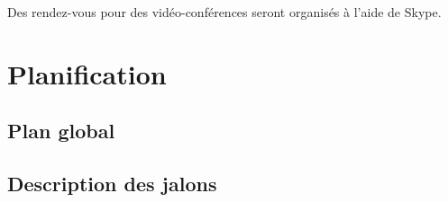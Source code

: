 		Des rendez-vous pour des vidéo-conférences seront organisés à l'aide de \gls{Skype}.
\section{Planification}
	\subsection{Plan global}

	 \subsection{Description des jalons}

		 \begin{longtable}{|c|l|p{10cm}|}


\end{longtable}
